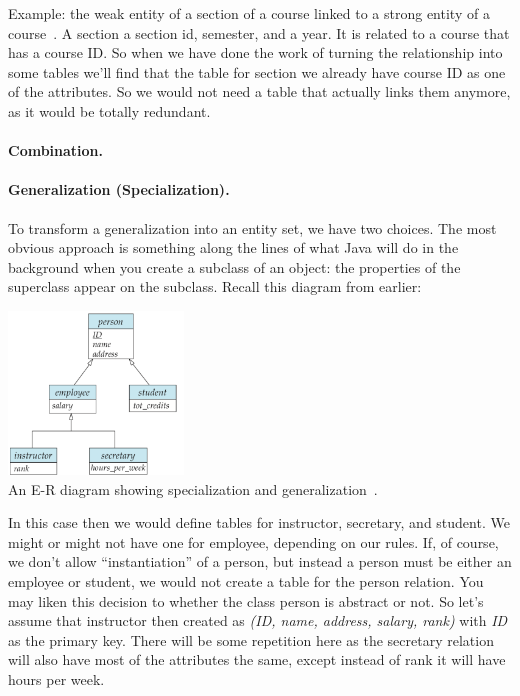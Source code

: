 Example: the weak entity of a section of a course linked to a strong entity of a course~\cite{dsc}. A section a section id, semester, and a year. It is related to a course that has a course ID. So when we have done the work of turning the relationship into some tables we'll find that the table for section we already have course ID as one of the attributes. So we would not need a table that actually links them anymore, as it would be totally redundant. 

\paragraph{Combination.}

\paragraph{Generalization (Specialization).} To transform a generalization into an entity set, we have two choices. The most obvious approach is something along the lines of what Java will do in the background when you create a subclass of an object: the properties of the superclass appear on the subclass. Recall this diagram from earlier:

\begin{center}
\includegraphics[width=0.35\textwidth]{images/specialization-generalization}\\
An E-R diagram showing specialization and generalization~\cite{dsc}.
\end{center}

In this case then we would define tables for instructor, secretary, and student. We might or might not have one for employee, depending on our rules. If, of course, we don't allow ``instantiation'' of a person, but instead a person must be either an employee or student, we would not create a table for the person relation. You may liken this decision to whether the class person is abstract or not.
So let's assume that instructor then created as \textit{(ID, name, address, salary, rank)} with \textit{ID} as the primary key. There will be some repetition here as the secretary relation will also have most of the attributes the same, except instead of rank it will have hours per week.

